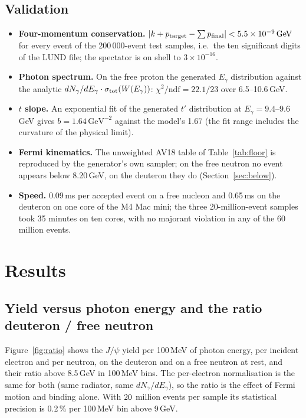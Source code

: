 \documentclass[11pt,a4paper]{article}
\newcommand{\Eg}{E_\gamma}
\newcommand{\jpsi}{J/\psi}
\newcommand{\GeV}{\,\mathrm{GeV}}
\begin{document}
\subsection{Validation}

\begin{itemize}
\item \textbf{Four-momentum conservation.}  $|k+p_{\rm target}-\sum p_{\rm final}|<5.5\times10^{-9}\GeV$
      for every event of the 200\,000-event test samples, i.e.\ the ten significant digits of the LUND
      file; the spectator is on shell to $3\times10^{-16}$.
\item \textbf{Photon spectrum.}  On the free proton the generated $\Eg$ distribution against the
      analytic $dN_\gamma/d\Eg\cdot\sigma_{\rm tot}(W(\Eg))$: $\chi^2/\mathrm{ndf}=22.1/23$ over
      6.5--10.6\,GeV.
\item \textbf{$t$ slope.}  An exponential fit of the generated $t'$ distribution at
      $\Eg=9.4$--9.6\,GeV gives $b=1.64\GeV^{-2}$ against the model's 1.67 (the fit range includes the
      curvature of the physical limit).
\item \textbf{Fermi kinematics.}  The unweighted AV18 table of Table~\ref{tab:floor} is reproduced by
      the generator's own sampler; on the free neutron no event appears below 8.20\,GeV, on the deuteron
      they do (Section~\ref{sec:below}).
\item \textbf{Speed.}  0.09\,ms per accepted event on a free nucleon and 0.65\,ms on the deuteron on
      one core of the M4 Mac mini; the three 20-million-event samples took 35 minutes on ten cores,
      with no majorant violation in any of the 60 million events.
\end{itemize}

\section{Results}
\label{sec:results}

\subsection{Yield versus photon energy and the ratio deuteron / free neutron}
\label{sec:ratio}

Figure~\ref{fig:ratio} shows the $\jpsi$ yield per 100\,MeV of photon energy, per incident electron
and per neutron, on the deuteron and on a free neutron at rest, and their ratio above 8.5\,GeV in
100\,MeV bins.  The per-electron normalisation is the same for both (same radiator, same
$dN_\gamma/d\Eg$), so the ratio is the effect of Fermi motion and binding alone.  With $20$ million
events per sample its statistical precision is 0.2\,\% per 100\,MeV bin above 9\,GeV.
\end{document}
